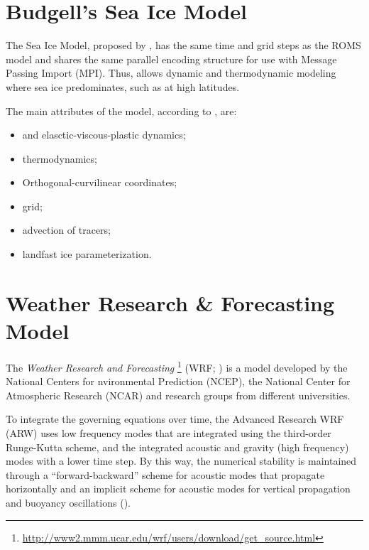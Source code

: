 
\section{Budgell's Sea Ice Model}\label{seaicesecao}
\bigskip

\noindent The Sea Ice Model, proposed by \textcite{Budgell2005}, has the same time and grid steps as the ROMS model and shares the same parallel encoding structure for use with Message Passing Import (MPI). 
Thus, allows dynamic and thermodynamic modeling where sea ice predominates, such as at high latitudes.
\bigskip

\noindent The main attributes of the model, according to \textcite{hedstrom2018}, are:
\bigskip
\begin{itemize}
    \item \textcite{Hunke1997} and \textcite{Hunke2001} elasctic-viscous-plastic dynamics;
    \item \textcite{Mellor1989} thermodynamics;
    \item Orthogonal-curvilinear coordinates;
    \item \textcite{Arakawa1977} grid;
    \item \textcite{Smolarkiewicz1990} advection of tracers;
    \item \textcite{Lemieux2015} landfast ice parameterization.
\end{itemize}
\bigskip



\section{Weather Research \& Forecasting Model}\label{secaowrf}
\bigskip

\noindent The \textcolor{bleu_cite}{\textit{Weather Research and Forecasting }\footnote{\textcolor{bleu_cite}{\href{http://www2.mmm.ucar.edu/wrf/users/download/get\_source.html}{http://www2.mmm.ucar.edu/wrf/users/download/get\_source.html}}}} 
(WRF; \cite{Skamarock2008}) is a model developed by the National Centers for nvironmental Prediction (NCEP), the National Center for 
Atmospheric Research (NCAR) and research groups from different universities.
\bigskip

\noindent To integrate the governing equations over time, the Advanced Research WRF (ARW) uses low frequency modes that are integrated using the third-order Runge-Kutta scheme, 
and the integrated acoustic and gravity (high frequency) modes with a lower time step. By this way, the numerical stability is maintained through a “forward-backward” scheme for
acoustic modes that propagate horizontally and an implicit scheme for acoustic modes for vertical propagation and buoyancy oscillations (\cite{Skamarock2008}).
\bigskip


